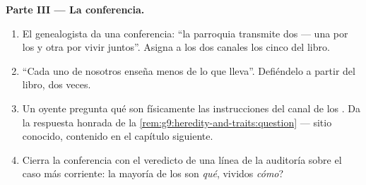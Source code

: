 \begin{problem}
\medskip\noindent\textbf{Parte III --- La conferencia.}
\begin{enumerate}[resume]
  \item El genealogista da una conferencia: ``la parroquia transmite
        dos  --- una por los  y otra por vivir
        juntos''. Asigna a los dos canales los cinco  del libro.
  \item ``Cada uno de nosotros enseña menos de lo que lleva''.
        Defiéndelo a partir del libro, dos veces.
  \item Un oyente pregunta qué son físicamente las instrucciones del
        canal de los . Da la respuesta honrada de la
        \cref{rem:g9:heredity-and-traits:question} --- sitio conocido,
        contenido en el capítulo siguiente.
  \item Cierra la conferencia con el veredicto de una línea de la
        auditoría sobre el caso más corriente: la mayoría de los 
        son \emph{qué}, vividos \emph{cómo}?
\end{enumerate}
\end{problem}
